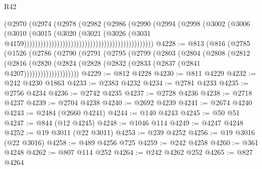 \begin{lexlean}{R42}
\begin{coremodule}
{                                                                  (@2970
                                                                    (@2974
                                                                      (@2978
                                                                        (@2982
                                                                          (@2986
                                                                            (@2990
                                                                              (@2994
                                                                                (@2998
                                                                                  (@3002
                                                                                    (@3006
                                                                                      (@3010
                                                                                        (@3015
                                                                                          (@3020
                                                                                            (@3021
                                                                                              (@3026
                                                                                                (@3031
                                                                                                  @4159)))))))))))))))))))))))))))))))))))))))))))))))
@4228 := @813
    (@816
      (@2785
        (@1526
          (@2786
            (@2790
              (@2791
                (@2795
                  (@2799
                    (@2803
                      (@2804
                        (@2808
                          (@2812
                            (@2816
                              (@2820
                                (@2824 (@2828 (@2832 (@2833 (@2837 (@2841 @4207))))))))))))))))))))
@4229 := @812 @4228
@4230 := @811 @4229
@4232 := @242 @4230 @1863
@4233 := @2383 @4232
@4234 := @2781 @4233
@4235 := @2756 @4234
@4236 := @2742 @4235
@4237 := @2728 @4236
@4238 := @2718 @4237
@4239 := @2704 @4238
@4240 := @2692 @4239
@4241 := @2674 @4240
@4243 := @2484 (@2660 @4241)
@4244 := @140 @4243
@4245 := @50 @51
@4247 := @844 (@12 @4245)
@4248 := @1046 @114
@4249 := @4247 @4248
@4252 := @19 @3011 (@22 @3011)
@4253 := @239 @4252
@4256 := @19 @3016 (@22 @3016)
@4258 := @489 @4256 @725
@4259 := @242 @4258
@4260 := @361 @4248
@4262 := @807 @114 @252
@4264 := @242 @4262 @252
@4265 := @827 @4264
}
\end{coremodule}
\end{lexlean}
